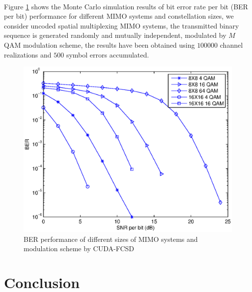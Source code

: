 \documentclass[12pt,a4paper,final]{article}
\begin{document}
\begin{spacing}{2.5}
\paragraph{}Figure \ref{BER curve} shows the Monte Carlo simulation results of bit error rate per bit (BER per bit) performance for different MIMO systems and constellation sizes, we consider uncoded spatial multiplexing MIMO systems, the transmitted binary sequence is generated randomly and  mutually independent, modulated by $M$QAM modulation scheme, the results have been obtained using $100000$ channel realizations and $500$ symbol errors accumulated. 
\begin{figure}[htb]
\centering
\includegraphics[scale=0.7]{BER_curves.eps}
\caption{BER performance of different sizes of MIMO systems and modulation scheme by CUDA-FCSD}
\label{BER curve}
\end{figure}
\section{Conclusion}\label{conclusion}

\end{spacing}
\end{document}
